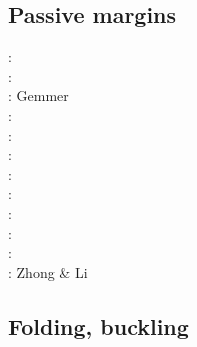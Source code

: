 \subsection{Passive margins} 

\begin{scriptsize}
\nineteeneightytwo: \cite{clwv82}\\
\nineteeneightysix: \cite{lies86}\\
\twothousandfive: Gemmer \etal \cite{gebi05}\\
\twothousandeight: \cite{clbz08}\cite{kasb08}\\
\twothousandten: \cite{fasm10}\cite{nigm10}\\
\twothousandeleven: \cite{rapy11}\cite{nigm11}\cite{brfo11}\\
\twothousandthirteen: \cite{mana13}\cite{yahb13}\\
\twothousandfourteen: \cite{macg14}\\
\twothousandfifteen: \cite{gebw15}\cite{nigo15}\\
\twothousandsixteen: \cite{dupm16}\\
\twothousandeighteen: \cite{sahf18}\cite{mube18}\cite{tebu18}\\
\twothousandnineteen: Zhong \& Li \cite{zhli19}
\end{scriptsize}


\subsection{Folding, buckling} 

